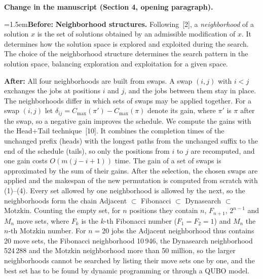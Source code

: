\documentclass[12pt]{article}
\newcommand{\change}[3]{\par\smallskip\noindent\textbf{Change in the manuscript (#1).}\par
  {\leftskip=1.5em\noindent\textbf{Before:} #2\par\noindent\textbf{After:} #3\par}}
\begin{document}
\change{Section 4, opening paragraph}{\textbf{Neighborhood structures.} Following~[2], a \emph{neighborhood} of a solution $x$ is the set of solutions obtained by an admissible modification of $x$. It determines how the solution space is explored and exploited during the search. The choice of the neighborhood structure determines the search pattern in the solution space, balancing exploration and exploitation for a given space.}{All four neighborhoods are built from swaps. A swap $(i,j)$ with $i<j$ exchanges the jobs at positions $i$ and $j$, and the jobs between them stay in place. The neighborhoods differ in which sets of swaps may be applied together. For a swap $(i,j)$ let $\delta_{ij}=C_{\max}(\pi')-C_{\max}(\pi)$ denote its gain, where $\pi'$ is $\pi$ after the swap, so a negative gain improves the schedule. We compute the gains with the Head+Tail technique~[10]. It combines the completion times of the unchanged prefix (heads) with the longest paths from the unchanged suffix to the end of the schedule (tails), so only the positions from $i$ to $j$ are recomputed, and one gain costs $O(m(j-i+1))$ time. The gain of a set of swaps is approximated by the sum of their gains. After the selection, the chosen swaps are applied and the makespan of the new permutation is computed from scratch with (1)--(4). Every set allowed by one neighborhood is allowed by the next, so the neighborhoods form the chain Adjacent $\subset$ Fibonacci $\subset$ Dynasearch $\subset$ Motzkin. Counting the empty set, for $n$ positions they contain $n$, $F_{n+1}$, $2^{n-1}$ and $M_n$ move sets, where $F_k$ is the $k$-th Fibonacci number ($F_1=F_2=1$) and $M_n$ the $n$-th Motzkin number. For $n=20$ jobs the Adjacent neighborhood thus contains 20 move sets, the Fibonacci neighborhood 10\,946, the Dynasearch neighborhood 524\,288 and the Motzkin neighborhood more than 50 million, so the larger neighborhoods cannot be searched by listing their move sets one by one, and the best set has to be found by dynamic programming or through a QUBO model.}
\end{document}

